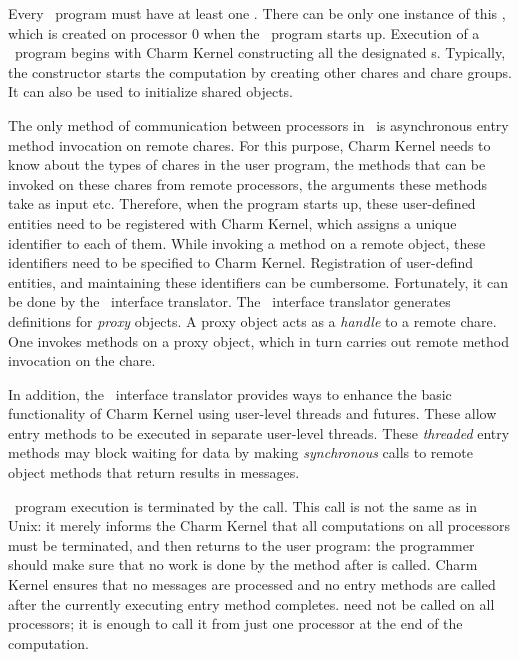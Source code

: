Every \charmpp\ program must have at least one .
There can be only one instance of this , which is created on 
processor 0 when the \charmpp\ program starts up.
Execution of a \charmpp\ program begins with Charm Kernel constructing all the
designated s.  Typically, the  constructor
starts the computation by creating other chares and chare 
groups.  It can also be used to initialize shared  objects.

The only method of communication between processors in \charmpp\ is 
asynchronous 
entry method invocation on remote chares. For this purpose, Charm Kernel needs
to know about the types of chares in the user program, the 
methods that can
be invoked on these chares from remote processors, the arguments these methods
take as input etc. Therefore, when the program starts up, these user-defined
entities need to be registered with Charm Kernel, which assigns a unique
identifier to each of them. While invoking a method on a remote object, these 
identifiers need to be specified to Charm Kernel. Registration of user-defind 
entities, and maintaining these identifiers can be cumbersome. Fortunately, 
it can be done
by the \charmpp\ interface translator. The \charmpp\ interface translator 
generates
definitions for {\em proxy} objects. A proxy object acts as a {\em handle} to 
a remote
chare. One invokes methods on a proxy object, which in turn carries out remote
method invocation on the chare.

In addition, the \charmpp\ interface translator provides ways to enhance the basic
functionality of Charm Kernel using user-level threads and futures. These allow
entry methods to be executed in separate user-level threads. 
These 
{\em threaded} entry methods may block waiting for data by making 
{\em synchronous} 
calls to remote object methods that return results in messages.

\charmpp\ program execution is terminated by the 
 call. This call is not the same as  in Unix:
it merely informs the Charm Kernel that all computations on all
processors must be terminated, and then returns to the user program:
the programmer should make sure that no work is done by the method after
 is called. Charm Kernel ensures that no
messages are processed and no entry methods are called after the
currently executing entry method completes.  need
not be called on all processors; it is enough to call it from just one
processor at the end of the computation.

